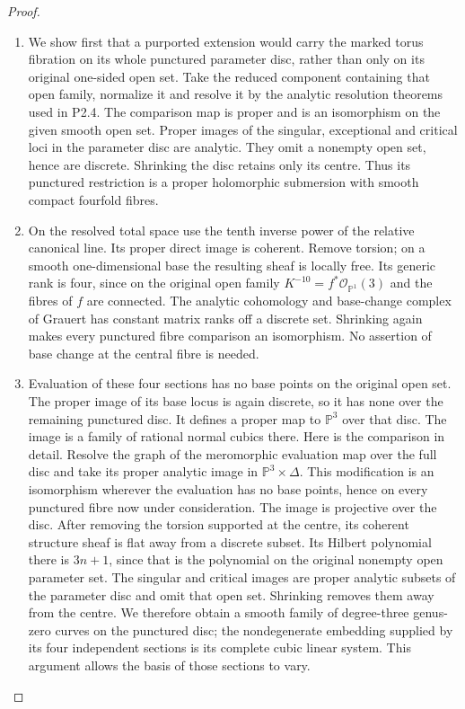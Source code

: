 \documentclass[11pt,a4paper]{article}
\theoremstyle{definition}
\begin{document}
\begin{proof}
\begin{enumerate}[label=\arabic*.]
\item We show first that a purported extension would carry the marked
torus fibration on its whole punctured parameter disc, rather
than only on its original one-sided open set.
Take the reduced component containing that open family,
normalize it and resolve it by the analytic resolution theorems
used in P2.4. The comparison map is proper and is an isomorphism
on the given smooth open set. Proper images of the singular,
exceptional and critical loci in the parameter disc are analytic.
They omit a nonempty open set, hence are discrete. Shrinking
the disc retains only its centre. Thus its punctured restriction
is a proper holomorphic submersion with smooth compact
fourfold fibres.

\item On the resolved total space use the tenth inverse power of the
relative canonical line. Its proper direct image is coherent.
Remove torsion; on a smooth one-dimensional base the resulting
sheaf is locally free. Its generic rank is four, since on the
original open family $K^{-10}=f^*\mathcal O_{\mathbb P^1}(3)$
and the fibres of $f$ are connected. The analytic cohomology
and base-change complex of Grauert has constant matrix ranks
off a discrete set. Shrinking again makes every punctured
fibre comparison an isomorphism. No assertion of base change
at the central fibre is needed.

\item Evaluation of these four sections has no base points on the
original open set. The proper image of its base locus is
again discrete, so it has none over the remaining punctured
disc. It defines a proper map to $\mathbb P^3$ over that
disc. The image is a family of rational normal cubics there.
Here is the comparison in detail. Resolve the graph of the
meromorphic evaluation map over the full disc and take its
proper analytic image in $\mathbb P^3\times\Delta$.
This modification is an isomorphism wherever the evaluation
has no base points, hence on every punctured fibre now under
consideration. The image is projective over the disc. After
removing the torsion supported at the centre, its coherent
structure sheaf is flat away from a discrete subset. Its
Hilbert polynomial there is $3n+1$, since that is the
polynomial on the original nonempty open parameter set.
The singular and critical images are proper analytic subsets
of the parameter disc and omit that open set. Shrinking
removes them away from the centre. We therefore obtain a
smooth family of degree-three genus-zero curves on the
punctured disc; the nondegenerate embedding supplied by its
four independent sections is its complete cubic linear system.
This argument allows the basis of those sections to vary.


\end{enumerate}
\end{proof}
\end{document}
